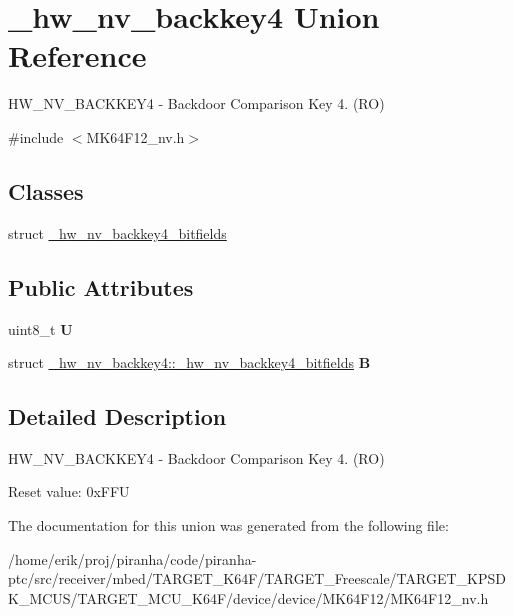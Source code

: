 \hypertarget{union__hw__nv__backkey4}{}\section{\+\_\+hw\+\_\+nv\+\_\+backkey4 Union Reference}
\label{union__hw__nv__backkey4}


H\+W\+\_\+\+N\+V\+\_\+\+B\+A\+C\+K\+K\+E\+Y4 -\/ Backdoor Comparison Key 4. (RO)  




{\ttfamily \#include $<$M\+K64\+F12\+\_\+nv.\+h$>$}

\subsection*{Classes}
\begin{DoxyCompactItemize}
\item 
struct \hyperlink{struct__hw__nv__backkey4_1_1__hw__nv__backkey4__bitfields}{\+\_\+hw\+\_\+nv\+\_\+backkey4\+\_\+bitfields}
\end{DoxyCompactItemize}
\subsection*{Public Attributes}
\begin{DoxyCompactItemize}
\item 
uint8\+\_\+t {\bfseries U}\hypertarget{union__hw__nv__backkey4_a8449808b87af410bcd2f44c1b345eb4a}{}\label{union__hw__nv__backkey4_a8449808b87af410bcd2f44c1b345eb4a}

\item 
struct \hyperlink{struct__hw__nv__backkey4_1_1__hw__nv__backkey4__bitfields}{\+\_\+hw\+\_\+nv\+\_\+backkey4\+::\+\_\+hw\+\_\+nv\+\_\+backkey4\+\_\+bitfields} {\bfseries B}\hypertarget{union__hw__nv__backkey4_abfc738e1bb7dde1af0c038234adf845f}{}\label{union__hw__nv__backkey4_abfc738e1bb7dde1af0c038234adf845f}

\end{DoxyCompactItemize}


\subsection{Detailed Description}
H\+W\+\_\+\+N\+V\+\_\+\+B\+A\+C\+K\+K\+E\+Y4 -\/ Backdoor Comparison Key 4. (RO) 

Reset value\+: 0x\+F\+FU 

The documentation for this union was generated from the following file\+:\begin{DoxyCompactItemize}
\item 
/home/erik/proj/piranha/code/piranha-\/ptc/src/receiver/mbed/\+T\+A\+R\+G\+E\+T\+\_\+\+K64\+F/\+T\+A\+R\+G\+E\+T\+\_\+\+Freescale/\+T\+A\+R\+G\+E\+T\+\_\+\+K\+P\+S\+D\+K\+\_\+\+M\+C\+U\+S/\+T\+A\+R\+G\+E\+T\+\_\+\+M\+C\+U\+\_\+\+K64\+F/device/device/\+M\+K64\+F12/M\+K64\+F12\+\_\+nv.\+h\end{DoxyCompactItemize}
